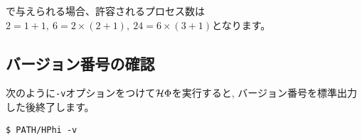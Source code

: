 \begin{enumerate}
\begin{itemize}
で与えられる場合、許容されるプロセス数は$2=1+1,~6=2\times(2+1),~24=6\times(3+1)$となります。

\end{itemize}

\subsection{バージョン番号の確認}

次のように\verb|-v|オプションをつけて$\mathcal{H} \Phi$を実行すると, 
バージョン番号を標準出力した後終了します。

\begin{verbatim}
$ PATH/HPhi -v
\end{verbatim}


\end{enumerate}

